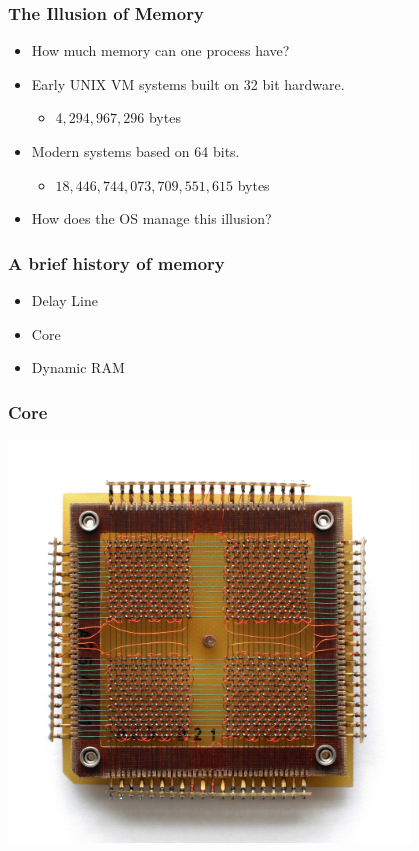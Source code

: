 \documentclass[pdftex]{beamer} %
\begin{document}
\begin{frame}
  \frametitle{The Illusion of Memory}
  \begin{itemize}
  \item How much memory can one process have?
  \item Early UNIX VM systems built on 32 bit hardware.
    \pause
    \begin{itemize}
    \item $4,294,967,296$ bytes
    \end{itemize}
    \pause
  \item Modern systems based on 64 bits.
    \begin{itemize}
    \item $18,446,744,073,709,551,615$ bytes
    \end{itemize}
  \item How does the OS manage this illusion?
  \end{itemize}
\end{frame}

\begin{frame}
  \frametitle{A brief history of memory}
  \begin{itemize}
  \item Delay Line
  \item Core
  \item Dynamic RAM
  \end{itemize}
\end{frame}

\begin{frame}
  \frametitle{Core}
  \begin{center}
    \includegraphics[width=0.8\textwidth]{../../figures/KL_CoreMemory.jpg}
  \end{center}
  
\end{frame}
\end{document}
